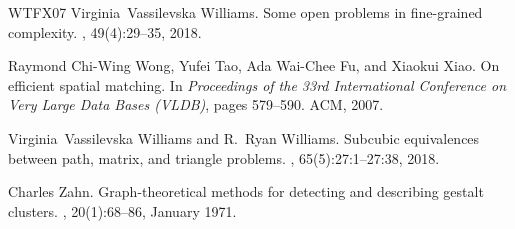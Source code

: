 \documentclass[11pt]{article}
\theoremstyle{plain}
\theoremstyle{remark}
\begin{document}
\begin{thebibliography}{WTFX07}
Virginia~Vassilevska Williams.
\newblock Some open problems in fine-grained complexity.
, 49(4):29--35, 2018.

Raymond Chi-Wing Wong, Yufei Tao, Ada Wai-Chee Fu, and Xiaokui Xiao.
\newblock On efficient spatial matching.
\newblock In {\em Proceedings of the 33rd International Conference on Very
  Large Data Bases (VLDB)}, pages 579--590. ACM, 2007.

Virginia~Vassilevska Williams and R.~Ryan Williams.
\newblock Subcubic equivalences between path, matrix, and triangle problems.
, 65(5):27:1--27:38, 2018.

Charles Zahn.
\newblock Graph-theoretical methods for detecting and describing gestalt
  clusters.
, 20(1):68--86, January 1971.

\end{thebibliography}
\end{document}
